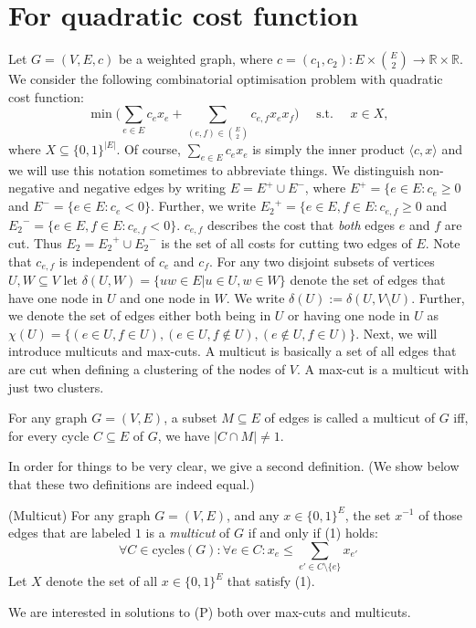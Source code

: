 \section{For quadratic cost function}
Let $G=(V,E,c)$ be a weighted graph, where $c=(c_1,c_2): E \times \binom{E}{2} \to \mathbb{R} \times \mathbb{R}$. 
We consider the following combinatorial optimisation problem with quadratic cost function: 
\begin{equation}
\tag{P}
 \min \Big(\sum_{e \in E} c_e x_e + \sum_{(e,f) \in {E \choose 2}} c_{e,f} x_e x_f \Big)  \quad \text{ s.t. } \quad x \in X,
\end{equation}
where $X \subseteq \{0,1\}^{|E|}$. Of course, $\sum_{e \in E} c_e x_e$ is simply the inner product $\langle c, x \rangle$ and we will use this notation sometimes to abbreviate things. 
We distinguish non-negative and negative edges by writing $E=E^+ \cup E^-$, where $E^+= \{e \in E: c_e \geq 0$ and $E^-=\{e \in E: c_e <0\}$. Further, we write ${E_2}^+=\{ e \in E, f \in E: c_{e,f} \geq 0$ and ${E_2}^- = \{e \in E, f \in E: c_{e,f} < 0\}$. $c_{e,f}$ describes the cost that \textit{both} edges $e$ and $f$ are cut. Thus $E_2={E_2}^+\cup{E_2}^- $ is the set of all costs for cutting two edges of $E$. Note that $c_{e,f}$ is independent of $c_e$ and $c_f$. 
For any two disjoint subsets of vertices $U,W \subseteq V$ let $\delta(U,W)= \{uw \in E| u \in U, w \in W\}$ denote the set of edges that have one node in $U$ and one node in $W$. We write $\delta(U):=\delta(U,V \setminus U)$. Further, we denote the set of edges either both being in $U$ or having one node in $U$ as $\chi(U)= \{(e \in U, f \in U), (e \in U, f \notin U), (e \notin U, f \in U) \}$.
Next, we will introduce multicuts and max-cuts. A multicut is basically a set of all edges that are cut when defining a clustering of the nodes of $V$. A max-cut is a multicut with just two clusters. 
\begin{definition}
For any graph $G=(V,E)$, a subset $M \subseteq E$ of edges is called a multicut of $G$ iff, for every cycle $C \subseteq E$ of $G$, we have $|C \cap M| \neq 1$.
\end{definition}
In order for things to be very clear, we give a second definition. (We show below that these two definitions are indeed equal.)
\begin{definition}{(Multicut)}
For any graph $G=(V,E)$, and any $x \in \{0,1\}^E$, the set $x^{-1}$ of those edges that are labeled $1$ is a \textit{multicut} of $G$ if and only if (1) holds: 
\begin{equation}
    \forall C \in \text{cycles}(G): \forall e \in C: x_e \leq \sum_{e' \in C \setminus \{e \}} x_{e'} 
\end{equation} Let $X$ denote the set of all $x \in \{0,1\}^E$ that satisfy (1).
\end{definition}
We are interested in solutions to (P) both over max-cuts and multicuts. 





